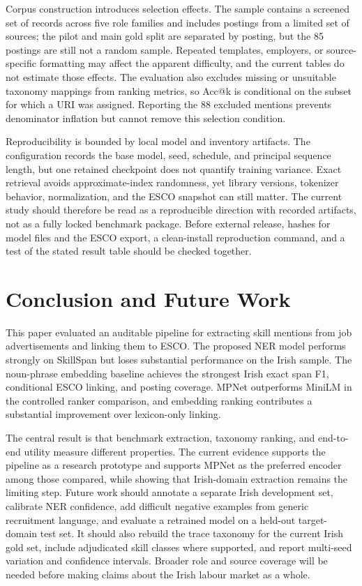 \documentclass[conference]{IEEEtran}
\begin{document}
Corpus construction introduces selection effects. The sample contains a screened set of records across five role families and includes postings from a limited set of sources; the pilot and main gold split are separated by posting, but the 85 postings are still not a random sample. Repeated templates, employers, or source-specific formatting may affect the apparent difficulty, and the current tables do not estimate those effects. The evaluation also excludes missing or unsuitable taxonomy mappings from ranking metrics, so Acc@k is conditional on the subset for which a URI was assigned. Reporting the 88 excluded mentions prevents denominator inflation but cannot remove this selection condition.

Reproducibility is bounded by local model and inventory artifacts. The configuration records the base model, seed, schedule, and principal sequence length, but one retained checkpoint does not quantify training variance. Exact retrieval avoids approximate-index randomness, yet library versions, tokenizer behavior, normalization, and the ESCO snapshot can still matter. The current study should therefore be read as a reproducible direction with recorded artifacts, not as a fully locked benchmark package. Before external release, hashes for model files and the ESCO export, a clean-install reproduction command, and a test of the stated result table should be checked together.

\section{Conclusion and Future Work}
This paper evaluated an auditable pipeline for extracting skill mentions from job advertisements and linking them to ESCO. The proposed NER model performs strongly on SkillSpan but loses substantial performance on the Irish sample. The noun-phrase embedding baseline achieves the strongest Irish exact span F1, conditional ESCO linking, and posting coverage. MPNet outperforms MiniLM in the controlled ranker comparison, and embedding ranking contributes a substantial improvement over lexicon-only linking.

The central result is that benchmark extraction, taxonomy ranking, and end-to-end utility measure different properties. The current evidence supports the pipeline as a research prototype and supports MPNet as the preferred encoder among those compared, while showing that Irish-domain extraction remains the limiting step. Future work should annotate a separate Irish development set, calibrate NER confidence, add difficult negative examples from generic recruitment language, and evaluate a retrained model on a held-out target-domain test set. It should also rebuild the trace taxonomy for the current Irish gold set, include adjudicated skill classes where supported, and report multi-seed variation and confidence intervals. Broader role and source coverage will be needed before making claims about the Irish labour market as a whole.
\end{document}
